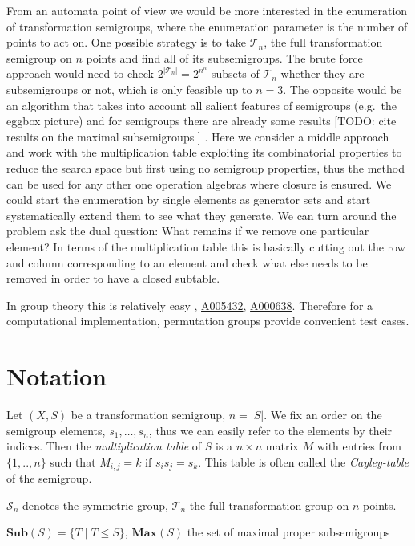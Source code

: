 \documentclass{amsart}
\newcommand{\cT}{{\mathcal T}}
\newcommand{\cS}{{\mathcal S}}
\newcommand{\Sub}{\mathbf{Sub}}
\newcommand{\Max}{\mathbf{Max}}
\newcommand{\todo}[1]{ \small \textsf{[TODO:  #1 ]} \normalsize}
\theoremstyle{plain}
\theoremstyle{definition}
\begin{document}
From an automata point of view we would be more interested in the enumeration of transformation semigroups, where the enumeration parameter is the number of points to act on. One possible strategy is to take $\cT_n$, the full transformation semigroup on $n$ points and find all of its subsemigroups. The brute force approach would need to check $2^{|\cT_n|}=2^{n^n}$ subsets of $\cT_n$ whether they are subsemigroups or not, which is only feasible up to $n=3$.
The opposite would be an algorithm that takes into account all salient features of semigroups (e.g.\ the eggbox picture) and for semigroups there are already some results \todo{cite results on the maximal subsemigroups}.  
Here we consider a middle approach and work with the multiplication table exploiting its combinatorial properties to reduce the search space but first using no semigroup properties, thus the method can be used for any other one operation algebras where closure is ensured. We could start the enumeration by single elements as generator sets and start systematically extend them to see what they generate. We can turn around the problem ask the dual question: What remains if we remove one particular element? In terms of the multiplication table this is basically cutting out the row and column corresponding to an element and check what else needs to be removed in order to have a closed subtable.

 In group theory this is relatively easy \cite{Pfeiffer04CountingSubGroups}, \href{https://oeis.org/A005432}{A005432}, \href{https://oeis.org/A000638}{A000638}.  Therefore for a computational implementation, permutation groups provide convenient test cases.



\section{Notation}
Let $(X,S)$ be a transformation semigroup, $n=|S|$. We fix an order on the semigroup elements, $s_1,\ldots, s_n$, thus we can easily refer to the elements by their indices. 
Then the  \emph{multiplication table} of $S$ is a $n\times n$ matrix $M$ with entries from $\{1,..,n\}$ such that $M_{i,j}=k$ if $s_is_j=s_k$. This table is often called the \emph{Cayley-table} of the semigroup.

$\cS_n$ denotes the symmetric group, $\cT_n$ the full transformation group on $n$ points.

$\Sub(S)=\big\{T\mid T\leq S \big\}$, $\Max(S)$ the set of maximal proper subsemigroups
\end{document}
